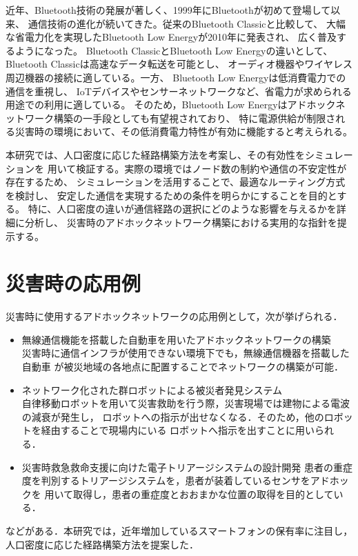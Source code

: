 \documentclass[a4paper, 11pt]{ltjsarticle}
\begin{document}
近年、Bluetooth技術の発展が著しく、1999年にBluetoothが初めて登場して以来、
通信技術の進化が続いてきた。従来のBluetooth Classicと比較して、
大幅な省電力化を実現したBluetooth Low Energyが2010年に発表され、
広く普及するようになった。
Bluetooth ClassicとBluetooth Low Energyの違いとして、
Bluetooth Classicは高速なデータ転送を可能とし、
オーディオ機器やワイヤレス周辺機器の接続に適している。一方、
Bluetooth Low Energyは低消費電力での通信を重視し、
IoTデバイスやセンサーネットワークなど、省電力が求められる用途での利用に適している。
そのため，Bluetooth Low Energyはアドホックネットワーク構築の一手段としても有望視されており、
特に電源供給が制限される災害時の環境において、その低消費電力特性が有効に機能すると考えられる。

本研究では、人口密度に応じた経路構築方法を考案し、その有効性をシミュレーションを
用いて検証する。実際の環境ではノード数の制約や通信の不安定性が存在するため、
シミュレーションを活用することで、最適なルーティング方式を検討し、
安定した通信を実現するための条件を明らかにすることを目的とする。
特に、人口密度の違いが通信経路の選択にどのような影響を与えるかを詳細に分析し、
災害時のアドホックネットワーク構築における実用的な指針を提示する。

\section{災害時の応用例}
災害時に使用するアドホックネットワークの応用例として，次が挙げられる．
\begin{itemize}
  \item 無線通信機能を搭載した自動車を用いたアドホックネットワークの構築\cite{震災時の活用例}\\
  災害時に通信インフラが使用できない環境下でも，無線通信機器を搭載した自動車
  が被災地域の各地点に配置することでネットワークの構築が可能．\\

  

  \item ネットワーク化された群ロボットによる被災者発見システム\cite{被災者発見システム}\\
  自律移動ロボットを用いて災害救助を行う際，災害現場では建物による電波の減衰が発生し，
  ロボットへの指示が出せなくなる．そのため，他のロボットを経由することで現場内にいる
  ロボットへ指示を出すことに用いられる．\\

  \item 災害時救急救命支援に向けた電子トリアージシステムの設計開発\cite{木山昇2010災害時救急救命支援に向けた電子トリアージシステムの設計開発}
  患者の重症度を判別するトリアージシステムを，患者が装着しているセンサをアドホックを
  用いて取得し，患者の重症度とおおまかな位置の取得を目的としている．
\end{itemize}
などがある．本研究では，近年増加しているスマートフォンの保有率に注目し，
人口密度に応じた経路構築方法を提案した．
\end{document}
